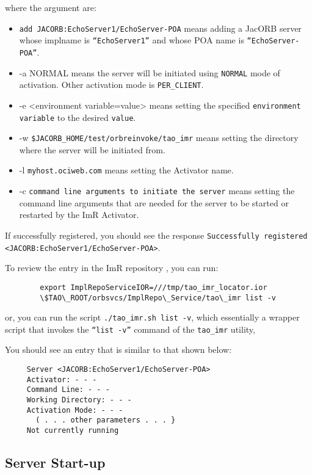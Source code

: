 where the argument are:
\begin{itemize}
    \item {\tt add JACORB:EchoServer1/EchoServer-POA} means
             adding a JacORB server whose implname is {\tt “EchoServer1”}
             and whose POA name is {\tt “EchoServer-POA”}.
    \item -a NORMAL means the server will be initiated using
             {\tt NORMAL} mode of activation.  Other activation mode
              is {\tt PER\_CLIENT}.
    \item -e <environment variable=value> means setting the specified
              {\tt environment variable} to the desired {\tt value}.
    \item -w {\tt \${JACORB\_HOME}/test/orbreinvoke/tao\_imr} means setting
               the directory where the server will be initiated from.
    \item -l {\tt myhost.ociweb.com} means setting the Activator name.
    \item -c {\tt command line arguments to initiate the server} means
               setting the command line arguments that are needed for the server
               to be started or restarted by the ImR Activator.
\end{itemize}

If successfully registered, you should see the response
{\tt Successfully registered <JACORB:EchoServer1/EchoServer-POA>}.

To review the entry in the ImR repository , you can run:

\begin{verbatim}
        export ImplRepoServiceIOR=///tmp/tao_imr_locator.ior
        \$TAO\_ROOT/orbsvcs/ImplRepo\_Service/tao\_imr list -v
\end{verbatim}

or, you can run the script {\tt ./tao\_imr.sh list -v}, which essentially
a wrapper script that invokes the {\tt “list -v”} command of the
{\tt tao_imr} utility,

You should see an entry that is similar to that shown below:

\small{
\begin{verbatim}
     Server <JACORB:EchoServer1/EchoServer-POA>
     Activator: - - -
     Command Line: - - -
     Working Directory: - - -
     Activation Mode: - - -
       ( . . . other parameters . . . }
     Not currently running
\end{verbatim}
}

\subsection{Server Start-up}

